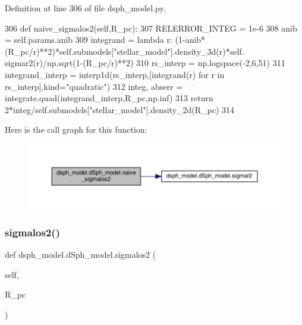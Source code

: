 Definition at line 306 of file dsph\+\_\+model.\+py.


\begin{DoxyCode}
306     \textcolor{keyword}{def }naive\_sigmalos2(self,R\_pc):
307         RELERROR\_INTEG = 1e-6
308         anib = self.params.anib
309         integrand = \textcolor{keyword}{lambda} r: (1-anib*(R\_pc/r)**2)*self.submodels[\textcolor{stringliteral}{"stellar\_model"}].density\_3d(r)*self.
      sigmar2(r)/np.sqrt(1-(R\_pc/r)**2)
310         rs\_interp = np.logspace(-2,6,51)
311         integrand\_interp = interp1d(rs\_interp,[integrand(r) \textcolor{keywordflow}{for} r \textcolor{keywordflow}{in} rs\_interp],kind=\textcolor{stringliteral}{"quadratic"}) 
312         integ, abserr = integrate.quad(integrand\_interp,R\_pc,np.inf)
313         \textcolor{keywordflow}{return} 2*integ/self.submodels[\textcolor{stringliteral}{"stellar\_model"}].density\_2d(R\_pc)
314     
\end{DoxyCode}
Here is the call graph for this function\+:
\nopagebreak
\begin{figure}[H]
\begin{center}
\leavevmode
\includegraphics[width=350pt]{d0/d25/classdsph__model_1_1dSph__model_a9db5b642eb5007933136db35b3acf84a_cgraph}
\end{center}
\end{figure}
\mbox{\label{classdsph__model_1_1dSph__model_a7b94850b439fe4afc431cfffa185d415}} 
\subsubsection{\texorpdfstring{sigmalos2()}{sigmalos2()}}
{\footnotesize\ttfamily def dsph\+\_\+model.\+d\+Sph\+\_\+model.\+sigmalos2 (\begin{DoxyParamCaption}\item[{}]{self,  }\item[{}]{R\+\_\+pc }\end{DoxyParamCaption})}




